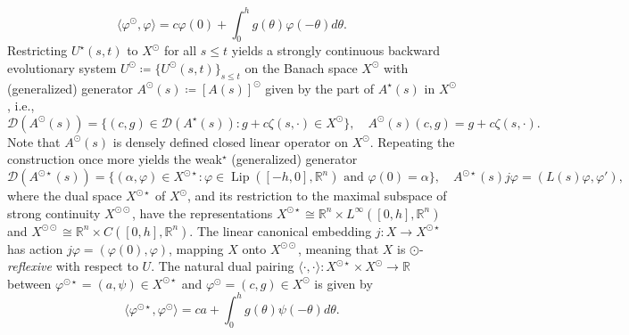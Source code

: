 \documentclass[english]{myarticle}
\DeclareMathOperator{\Lip}{Lip}
\begin{document}
\begin{sloppypar}
\begin{equation}
    \langle \varphi^\odot, \varphi \rangle = c \varphi(0) + \int_0^h g(\theta) \varphi(-\theta) d\theta.
\end{equation}
Restricting $U^\star(s,t)$ to $X^\odot$ for all $s \leq t$ yields a strongly continuous backward evolutionary system $U^\odot \coloneqq \{U^\odot(s,t)\}_{s \leq t}$ on the Banach space $X^\odot$ with (generalized) generator $A^\odot(s) \coloneqq [A(s)]^\odot$ given by the part of $A^\star(s)$ in $X^\odot$, i.e.,
\begin{equation} \label{eq:D(Asuns)}
    \mathcal{D}(A^\odot(s)) = \{(c,g) \in \mathcal{D}(A^\star(s)) : g+c\zeta(s,\cdot) \in X^{\odot} \}, \quad A^\odot(s)(c,g) = g + c\zeta(s,\cdot).
\end{equation}
Note that $A^\odot(s)$ is densely defined closed linear operator on $X^\odot$. Repeating the construction once more yields the weak$^\star$ (generalized) generator
\begin{equation*}
    \mathcal{D}(A^{\odot \star}(s)) = \{ (\alpha,\varphi) \in X^{\odot \star} : \varphi \in \Lip([-h,0],\mathbb{R}^n) \mbox{ and } \varphi(0) = \alpha \}, \quad A^{\odot \star}(s)j\varphi = (L(s)\varphi,\varphi'),
\end{equation*}
where the dual space $X^{\odot \star}$ of $X^{\odot}$, and its restriction to the maximal subspace of strong continuity $X^{\odot \odot}$, have the representations $X^{\odot \star} \cong \mathbb{R}^{n} \times L^\infty([0,h], \mathbb{R}^{n})$ and $X^{\odot \odot} \cong \mathbb{R}^{n} \times C([0,h], \mathbb{R}^{n})$. The linear canonical embedding $j: X \to X^{\odot \star}$ has action $j\varphi = (\varphi(0),\varphi)$, mapping $X$ onto $X^{\odot \odot}$, meaning that $X$ is $\odot$-\emph{reflexive} with respect to $U$. The natural dual pairing $\langle \cdot, \cdot \rangle : X^{\odot \star} \times X^\odot \to \mathbb{R}$ between $\varphi^{\odot \star} = (a,\psi) \in X^{\odot \star}$ and $\varphi^\odot = (c,g) \in X^{\odot}$ is given by
\begin{equation} \label{eq:Xsunstarpairing}
    \langle \varphi^{\odot \star}, \varphi^\odot \rangle = ca + \int_0^h g(\theta) \psi(-\theta) d\theta.
\end{equation}


\end{sloppypar}
\end{document}
